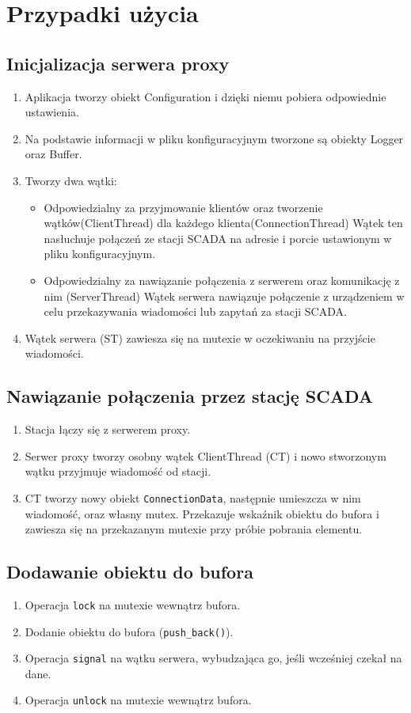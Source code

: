 \documentclass[a4paper]{article}
\begin{document}
\section{Przypadki użycia}
\subsection{Inicjalizacja serwera proxy}
\begin{enumerate}
\item Aplikacja tworzy obiekt Configuration i dzięki niemu pobiera odpowiednie ustawienia.
\item Na podstawie informacji w pliku konfiguracyjnym tworzone są obiekty Logger oraz Buffer.
\item Tworzy dwa wątki:
\begin{itemize}
\item Odpowiedzialny za przyjmowanie klientów oraz tworzenie wątków(ClientThread) dla każdego klienta(ConnectionThread)
Wątek ten nasłuchuje połączeń ze stacji SCADA na adresie i porcie ustawionym w pliku konfiguracyjnym.
\item Odpowiedzialny za nawiązanie połączenia z serwerem oraz komunikację z nim (ServerThread)
Wątek serwera nawiązuje połączenie z urządzeniem w celu przekazywania wiadomości lub zapytań za stacji SCADA.
\end{itemize}
\item Wątek serwera (ST) zawiesza się na mutexie w oczekiwaniu na przyjście wiadomości.
\end{enumerate}

\subsection{Nawiązanie połączenia przez stację SCADA}
\begin{enumerate}
\item Stacja łączy się z serwerem proxy.
\item Serwer proxy tworzy osobny wątek ClientThread (CT) i nowo stworzonym wątku przyjmuje wiadomość od stacji.
\item CT tworzy nowy obiekt \texttt{ConnectionData}, następnie umieszcza w nim wiadomość, oraz własny mutex. Przekazuje wskaźnik obiektu do bufora i zawiesza się na przekazanym mutexie przy próbie pobrania elementu.
\end{enumerate}

\subsection{Dodawanie obiektu do bufora}
\begin{enumerate}
\item Operacja \texttt{lock} na mutexie wewnątrz bufora.
\item Dodanie obiektu do bufora (\texttt{push\_back()}).
\item Operacja \texttt{signal} na wątku serwera, wybudzająca go, jeśli wcześniej czekał na dane.
\item Operacja \texttt{unlock} na mutexie wewnątrz bufora.
\end{enumerate}
\end{document}
